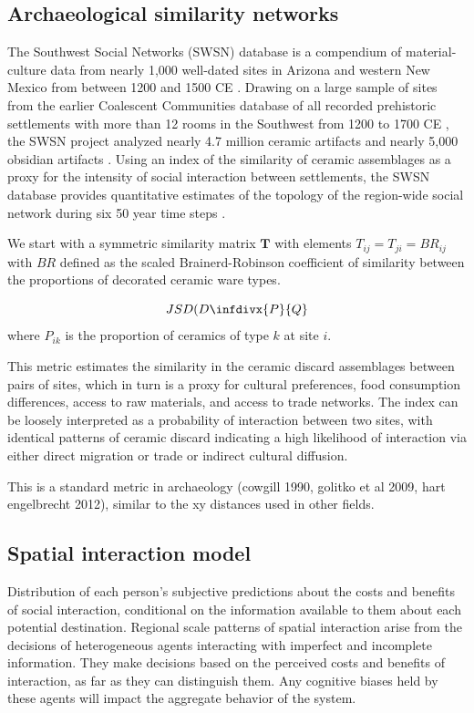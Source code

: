 \documentclass[11pt]{wlscirep}
\newcommand{\infdiv}{D\infdivx}
\begin{document}
\subsection*{Archaeological similarity networks}

The Southwest Social Networks (SWSN) database is a compendium of material-culture data from nearly 1,000 well-dated sites in Arizona and western New Mexico from between 1200 and 1500 CE \cite{Mills2012,Mills2013a,Peeples2013,Borck2015,Hill2015,Mills2015a}. Drawing on a large sample of sites from the earlier Coalescent Communities database of all recorded prehistoric settlements with more than 12 rooms in the Southwest from 1200 to 1700 CE \cite{Hill2004}, the SWSN project analyzed nearly 4.7 million ceramic artifacts and nearly 5,000 obsidian artifacts \cite{Mills2015a}. Using an index of the similarity of ceramic assemblages as a proxy for the intensity of social interaction between settlements, the SWSN database provides quantitative estimates of the topology of the region-wide social network during six 50 year time steps \cite{Mills2013a}.

We start with a symmetric similarity matrix $\mathbf{T}$ with elements $T_{ij} = T_{ji} = BR_{ij}$ with $BR$ defined as the scaled Brainerd-Robinson coefficient of similarity between the proportions of decorated ceramic ware types.

\begin{equation}
    JSD( \infdiv{P}{Q}
\end{equation}
where $P_{ik}$ is the proportion of ceramics of type $k$ at site $i$.

This metric estimates the similarity in the ceramic discard assemblages between pairs of sites, which in turn is a proxy for cultural preferences, food consumption differences, access to raw materials, and access to trade networks. The index can be loosely interpreted as a probability of interaction between two sites, with identical patterns of ceramic discard indicating a high likelihood of interaction via either direct migration or trade or indirect cultural diffusion.

This is a standard metric in archaeology (cowgill 1990, golitko et al 2009, hart engelbrecht 2012), similar to the xy distances used in other fields.

\subsection*{Spatial interaction model}
Distribution of each person's subjective predictions about the costs and benefits of social interaction, conditional on the information available to them about each potential destination. Regional scale patterns of spatial interaction arise from the decisions of heterogeneous agents interacting with imperfect and incomplete information. They make decisions based on the perceived costs and benefits of interaction, as far as they can distinguish them. Any cognitive biases held by these agents will impact the aggregate behavior of the system.
\end{document}
